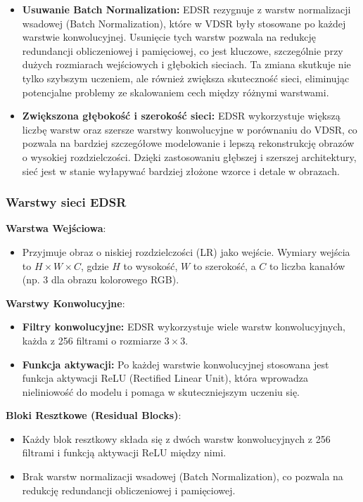 \documentclass[10pt]{article}
\begin{document}
\begin{itemize}
    \item \textbf{Usuwanie Batch Normalization:} EDSR rezygnuje z warstw normalizacji wsadowej (Batch Normalization), które w VDSR były stosowane po każdej warstwie konwolucyjnej. Usunięcie tych warstw pozwala na redukcję redundancji obliczeniowej i pamięciowej, co jest kluczowe, szczególnie przy dużych rozmiarach wejściowych i głębokich sieciach. Ta zmiana skutkuje nie tylko szybszym uczeniem, ale również zwiększa skuteczność sieci, eliminując potencjalne problemy ze skalowaniem cech między różnymi warstwami.
    \item \textbf{Zwiększona głębokość i szerokość sieci:} EDSR wykorzystuje większą liczbę warstw oraz szersze warstwy konwolucyjne w porównaniu do VDSR, co pozwala na bardziej szczegółowe modelowanie i lepszą rekonstrukcję obrazów o wysokiej rozdzielczości. Dzięki zastosowaniu głębszej i szerszej architektury, sieć jest w stanie wyłapywać bardziej złożone wzorce i detale w obrazach.
\end{itemize}

\subsubsection*{Warstwy sieci EDSR}

\textbf{Warstwa Wejściowa}:
\begin{itemize}
    \item Przyjmuje obraz o niskiej rozdzielczości (LR) jako wejście. Wymiary wejścia to \( H \times W \times C \), gdzie \( H \) to wysokość, \( W \) to szerokość, a \( C \) to liczba kanałów (np. 3 dla obrazu kolorowego RGB).
\end{itemize}

\textbf{Warstwy Konwolucyjne}:
\begin{itemize}
    \item \textbf{Filtry konwolucyjne:} EDSR wykorzystuje wiele warstw konwolucyjnych, każda z 256 filtrami o rozmiarze \( 3 \times 3 \).
    \item \textbf{Funkcja aktywacji:} Po każdej warstwie konwolucyjnej stosowana jest funkcja aktywacji ReLU (Rectified Linear Unit), która wprowadza nieliniowość do modelu i pomaga w skuteczniejszym uczeniu się.
\end{itemize}

\textbf{Bloki Resztkowe (Residual Blocks)}:
\begin{itemize}
    \item Każdy blok resztkowy składa się z dwóch warstw konwolucyjnych z 256 filtrami i funkcją aktywacji ReLU między nimi.
    \item Brak warstw normalizacji wsadowej (Batch Normalization), co pozwala na redukcję redundancji obliczeniowej i pamięciowej.
\end{itemize}
\end{document}
